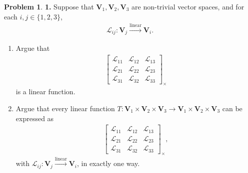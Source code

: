 \documentclass{article}
\theoremstyle{definition}
\newtheorem*{prob*}{Problem}
\newcommand{\V}{\mathbf{V}}
\newcommand{\lag}{\mathcal{L}}
\begin{document}
\begin{prob*}\textbf{1.} Suppose that $\V_1, \V_2, \V_3$ are non-trivial vector spaces, and for each $i,j \in \{ 1,2,3\}$,
	\begin{align*}
	\lag_{ij} : \V_j \overset{\text{linear}}{\longrightarrow} \V_i.
	\end{align*}
	\begin{enumerate}
		\item Argue that 
		\begin{align*}
		\begin{bmatrix}
		\lag_{11} & \lag_{12} & \lag_{13}\\
		\lag_{21} & \lag_{22} & \lag_{23}\\
		\lag_{31} & \lag_{32} & \lag_{33}
		\end{bmatrix}_\times
		\end{align*}
		is a linear function.\\
		
		\item Argue that every linear function $T : \V_1 \times \V_2 \times \V_3 \to \V_1\times\V_2\times \V_3$ can be expressed as 
		\begin{align*} 
		\begin{bmatrix}
		\lag_{11} & \lag_{12} & \lag_{13}\\
		\lag_{21} & \lag_{22} & \lag_{23}\\
		\lag_{31} & \lag_{32} & \lag_{33} 
		\end{bmatrix}_\times,
		\end{align*} 
		with $\lag_{ij} : \V_j \overset{\text{linear}}{\longrightarrow} \V_i$, in exactly one way. \\
		

\end{enumerate}
\end{prob*}
\end{document}
